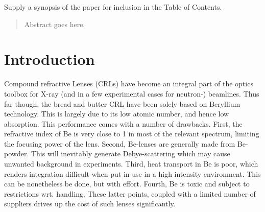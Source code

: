 \documentclass[preprint]{iucr}              %
\begin{document}

\maketitle                        %

\begin{synopsis}
Supply a synopsis of the paper for inclusion in the Table of Contents.
\end{synopsis}

\begin{abstract}
Abstract goes here.
\end{abstract}



\section{Introduction}
Compound refractive Lenses (CRLs) have become an integral part of the optics toolbox for X-ray (and in a few experimental cases for neutron-) beamlines. Thus far though, the bread and butter CRL have been solely based on Beryllium technology. This is largely due to its low atomic number, and  hence low absorption. This performance comes with a number of drawbacks. First, the refractive index of Be is very close to 1 in most of the relevant spectrum, limiting the focusing power of the lens. Second, Be-lenses are generally made from Be-powder. This will inevitably generate Debye-scattering which may cause unwanted background in experiments. Third,  heat transport in Be is poor, which renders integration difficult when put in use in a high intensity environment. This can be nonetheless be done, but with effort. Fourth, Be is toxic and subject to restrictions wrt. handling. These latter points, coupled with a limited number of suppliers drives up the cost of such lenses significantly.
\end{document}
